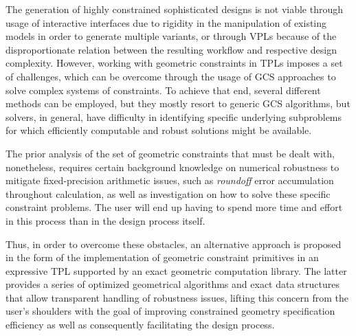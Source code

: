 \cleardoublepage
\label{chap:conclusion}


The generation of highly constrained sophisticated designs is not viable through
usage of interactive interfaces due to rigidity in the manipulation of existing
models in order to generate multiple variants, or through \acp{VPL} because of
the disproportionate relation between the resulting workflow and respective
design complexity.  However, working with geometric constraints in \acp{TPL}
imposes a set of challenges, which can be overcome through the usage of \ac{GCS}
approaches to solve complex systems of constraints.  To achieve that end,
several different methods can be employed, but they mostly resort to generic
\acs{GCS} algorithms, but solvers, in general, have difficulty in identifying
specific underlying subproblems for which efficiently computable and robust
solutions might be available.

The prior analysis of the set of geometric constraints that must be dealt with,
nonetheless, requires certain background knowledge on numerical robustness to
mitigate fixed-precision arithmetic issues, such as \textit{roundoff} error
accumulation throughout calculation, as well as investigation on how to solve
these specific constraint problems.  The user will end up having to spend more
time and effort in this process than in the design process itself.

Thus, in order to overcome these obstacles, an alternative approach is proposed
in the form of the implementation of geometric constraint primitives in an
expressive \ac{TPL} supported by an exact geometric computation library.  The
latter provides a series of optimized geometrical algorithms and exact data
structures that allow transparent handling of robustness issues, lifting this
concern from the user's shoulders with the goal of improving constrained
geometry specification efficiency as well as consequently facilitating the
design process.
